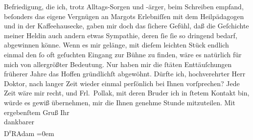 \begin{ledgroupsized}[t]{13cm}
               Befriedigung, die ich, trotz Alltags-Sorgen und -ärger, beim Schreiben {\pb}empfand, beſonders das eigene Vergnügen an
                  Margots Erlebniſſen mit dem
               Heilpädagogen und in der Kaffeehausecke, gaben mir doch das ſichere Gefühl, daß die
               Geſchichte meiner Heldin auch andern etwas Sympathie, deren ſie ſie so dringend
               bedarf, abgewinnen könne. Wenn es mir gelänge, mit dieſem leichten Stück endlich
               einmal den ſo oft geſuchten Eingang zur Bühne zu finden, wäre es natürlich für mich
               von allergrößter Bedeutung. Nur haben mir die ſtäten Enttäuſchungen früherer Jahre
               das Hoffen gründlichſt abgewöhnt.\pend
           \pstart
           {\pb}Dürfte ich, hochverehrter Herr Doktor,
               nach langer Zeit wieder einmal perſönlich bei Ihnen vorſprechen? Jede Zeit wäre mir
               recht, und Frl. Pollak, mit deren Bruder ich in ſtetem Kontakt
               bin, würde es gewiß übernehmen, mir die Ihnen genehme Stunde mitzuteilen.\pend
           \pstart
           Mit ergebenſtem Gruß Ihr{\\[\baselineskip]}dankbarer{\\[\baselineskip]}\spacefill\mbox{D\textsuperscript{r}RAdam}\pend
           \leftskip=0em{}
         
         \endnumbering{}\end{ledgroupsized}  \newcommand{\dateiname}{L02510}\newcommand{\titel}{Robert Adam an Arthur Schnitzler, 7. 6. 1929}\newcommand{\editorInnen}{Martin Anton Müller und Gerd-Hermann Susen}
      